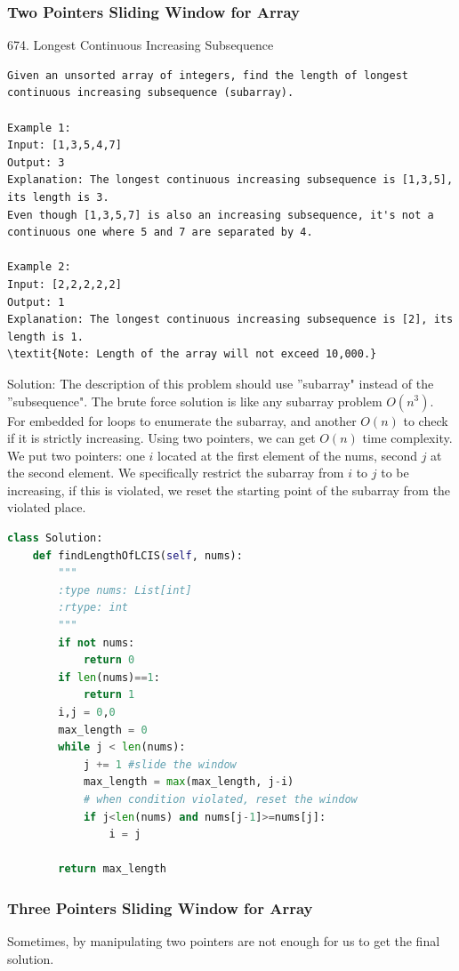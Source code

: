 \documentclass[../specific-algorithms.tex]{subfiles}
\begin{document}
\subsubsection{Two Pointers Sliding Window for Array}
674. Longest Continuous Increasing Subsequence
\begin{lstlisting}
Given an unsorted array of integers, find the length of longest continuous increasing subsequence (subarray).

Example 1:
Input: [1,3,5,4,7]
Output: 3
Explanation: The longest continuous increasing subsequence is [1,3,5], its length is 3. 
Even though [1,3,5,7] is also an increasing subsequence, it's not a continuous one where 5 and 7 are separated by 4.

Example 2:
Input: [2,2,2,2,2]
Output: 1
Explanation: The longest continuous increasing subsequence is [2], its length is 1.
\textit{Note: Length of the array will not exceed 10,000.}
\end{lstlisting}
Solution: The description of this problem should use ''subarray" instead of the ''subsequence".  The brute force solution is like any subarray problem $O(n^3)$. For embedded for loops to enumerate the subarray, and another $O(n)$ to check if it is strictly increasing.  Using two pointers, we can get $O(n)$ time complexity. We put two pointers: one $i$ located at the first element of the nums, second $j$ at the second element. We specifically restrict the subarray from $i$ to $j$ to be increasing, if this is violated, we reset the starting point of the subarray from the violated place.  
\begin{lstlisting}[language = Python]
class Solution:
    def findLengthOfLCIS(self, nums):
        """
        :type nums: List[int]
        :rtype: int
        """
        if not nums:
            return 0
        if len(nums)==1:
            return 1
        i,j = 0,0
        max_length = 0
        while j < len(nums):
            j += 1 #slide the window
            max_length = max(max_length, j-i)
            # when condition violated, reset the window
            if j<len(nums) and nums[j-1]>=nums[j]:
                i = j
                         
        return max_length
\end{lstlisting}

\subsubsection{Three Pointers Sliding  Window for Array}
Sometimes, by manipulating two pointers are not enough for us to get the final solution. 
\end{document}
